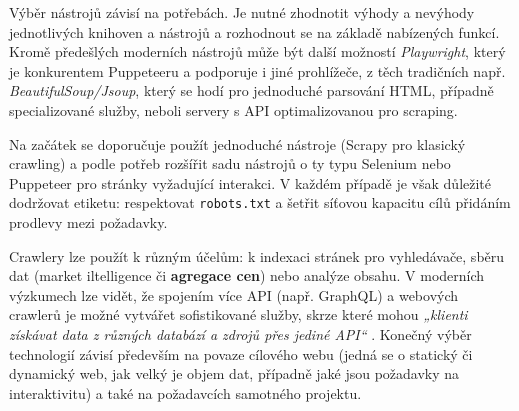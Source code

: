 Výběr nástrojů závisí na potřebách. Je nutné zhodnotit výhody a nevýhody
jednotlivých knihoven a nástrojů a rozhodnout se na základě nabízených
funkcí. Kromě předešlých moderních nástrojů může být další možností
\emph{Playwright}, který je konkurentem Puppeteeru a podporuje i jiné
prohlížeče, z těch tradičních např. \emph{BeautifulSoup/Jsoup}, který
se hodí pro jednoduché parsování HTML, případně specializované služby,
neboli servery s API optimalizovanou pro scraping.

Na začátek se doporučuje použít jednoduché nástroje (Scrapy pro klasický
crawling) a podle potřeb rozšířit sadu nástrojů o ty typu Selenium nebo
Puppeteer pro stránky vyžadující interakci. V každém případě je však
důležité dodržovat etiketu: respektovat \texttt{robots.txt}
\cite{YHVfLHsNlUItkF6G,adi8S69Mmo0Mi7FC} %
a šetřit síťovou kapacitu cílů přidáním prodlevy mezi požadavky.

Crawlery lze použít k různým účelům: k indexaci stránek pro vyhledávače,
sběru dat (market iltelligence či \textbf{agregace cen}) nebo analýze obsahu.
V moderních výzkumech lze vidět, že spojením více API (např. GraphQL)
a webových crawlerů je možné vytvářet sofistikované služby, skrze které
mohou \emph{„klienti získávat data z různých databází a zdrojů přes
jediné API“} \cite{YHVfLHsNlUItkF6G,Sj7FFY7SXnJ6m41T}. %
Konečný výběr technologií závisí především na povaze cílového webu (jedná se
o statický či dynamický web, jak velký je objem dat, případně jaké jsou
požadavky na interaktivitu) a také na požadavcích samotného projektu.

\endinput
